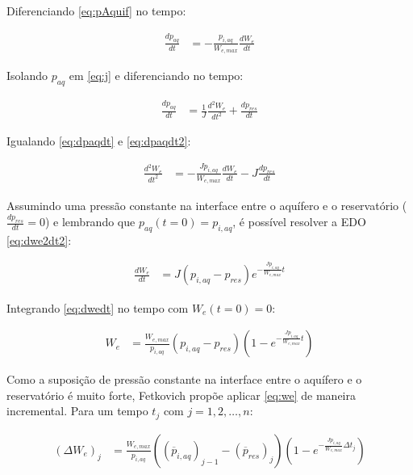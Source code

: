 \documentclass[final,5p]{elsarticle}
\numberwithin{equation}{section}
\begin{document}
        Diferenciando \ref{eq:pAquif} no tempo:

        \begin{align}
            \frac{dp_{aq}}{dt} &= - \frac{p_{i,aq}}{W_{e,max}} \frac{dW_e}{dt} \label{eq:dpaqdt}
        \end{align}

        Isolando $p_{aq}$ em \ref{eq:j} e diferenciando no tempo:

        \begin{align}
            \frac{dp_{aq}}{dt} &= \frac{1}{J} \frac{d^2W_e}{dt^2} + \frac{dp_{res}}{dt} \label{eq:dpaqdt2}
        \end{align}

        Igualando \ref{eq:dpaqdt} e \ref{eq:dpaqdt2}:

        \begin{align}
            \frac{d^2W_e}{dt^2} &= - \frac{J p_{i,aq}}{W_{e,max}} \frac{dW_e}{dt} - J \frac{dp_{res}}{dt} \label{eq:dwe2dt2}
        \end{align}

        Assumindo uma pressão constante na interface entre o aquífero e o reservatório ($\frac{dp_{res}}{dt} = 0$) e lembrando que $p_{aq}(t=0)=p_{i,aq}$, é possível resolver a EDO \ref{eq:dwe2dt2}:

        \begin{align}
            \frac{dW_e}{dt} &= J (p_{i,aq} - p_{res}) e^{-\frac{J p_{i,aq}}{W_{e,max}} t} \label{eq:dwedt}
        \end{align}

        Integrando \ref{eq:dwedt} no tempo com $W_e(t=0)=0$:

        \begin{align}
            W_e &= \frac{W_{e,max}}{p_{i,aq}} (p_{i,aq} - p_{res}) \left( 1- e^{-\frac{J p_{i,aq}}{W_{e,max}} t} \right) \label{eq:we}
        \end{align}

        Como a suposição de pressão constante na interface entre o aquífero e o reservatório é muito forte, Fetkovich propõe aplicar \ref{eq:we} de maneira incremental. Para um tempo $t_j$ com $j=1,2,\ldots,n$:

        \begin{align}
            (\Delta W_e)_j &= \frac{W_{e,max}}{p_{i,aq}} ((\overline{p}_{i,aq})_{j-1} - (\overline{p}_{res})_j) \left( 1- e^{-\frac{J p_{i,aq}}{W_{e,max}} \Delta t_j} \right) \label{eq:deltawe}
        \end{align}
\end{document}

